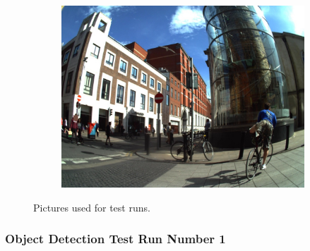 \begin{figure}[H]
\begin{subfigure}{0.3\textwidth}
  \includegraphics[width=\textwidth]{Sections/4InitialWork/4_images_obj_run4/photo.jpg}
  \end{subfigure}

  \caption{ 
  Pictures used for test runs.}
  \end{figure}

  \newpage
      \subsubsection{Object Detection Test Run Number 1}

    

